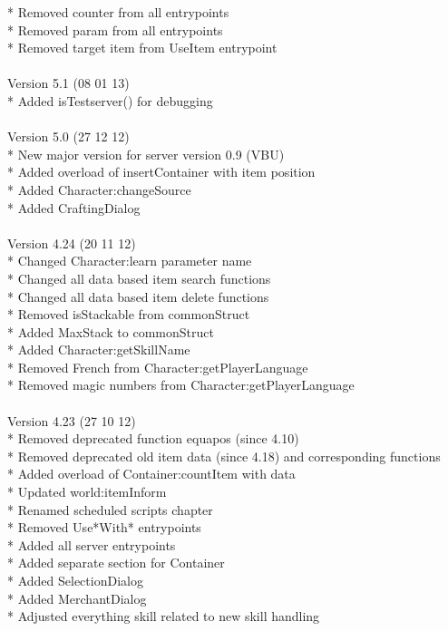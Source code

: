 \documentclass[a4paper,10pt,makeidx]{scrreprt}
\begin{document}
* Removed counter from all entrypoints\\
* Removed param from all entrypoints\\
* Removed target item from UseItem entrypoint\\
\\
Version 5.1 (08 01 13)\\
* Added isTestserver() for debugging\\
\\
Version 5.0 (27 12 12)\\
* New major version for server version 0.9 (VBU)\\
* Added overload of insertContainer with item position\\
* Added Character:changeSource\\
* Added CraftingDialog\\
\\
Version 4.24 (20 11 12)\\
* Changed Character:learn parameter name\\
* Changed all data based item search functions\\
* Changed all data based item delete functions\\
* Removed isStackable from commonStruct\\
* Added MaxStack to commonStruct\\
* Added Character:getSkillName\\
* Removed French from Character:getPlayerLanguage\\
* Removed magic numbers from Character:getPlayerLanguage\\
\\
Version 4.23 (27 10 12)\\
* Removed deprecated function equapos (since 4.10)\\
* Removed deprecated old item data (since 4.18) and corresponding functions\\
* Added overload of Container:countItem with data\\
* Updated world:itemInform\\
* Renamed scheduled scripts chapter\\
* Removed Use*With* entrypoints\\
* Added all server entrypoints\\
* Added separate section for Container\\
* Added SelectionDialog\\
* Added MerchantDialog\\
* Adjusted everything skill related to new skill handling\\
\end{document}
